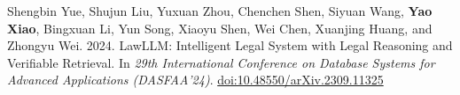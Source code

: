 Shengbin Yue, Shujun Liu, Yuxuan Zhou, Chenchen Shen, Siyuan Wang, \textbf{Yao Xiao}, Bingxuan Li, Yun Song, Xiaoyu Shen, Wei Chen, Xuanjing Huang, and Zhongyu Wei. 2024. LawLLM: Intelligent Legal System with Legal Reasoning and Verifiable Retrieval. In \textit{29th International Conference on Database Systems for Advanced Applications (DASFAA'24)}. \href{https://doi.org/10.48550/arXiv.2309.11325}{doi:10.48550/arXiv.2309.11325}
